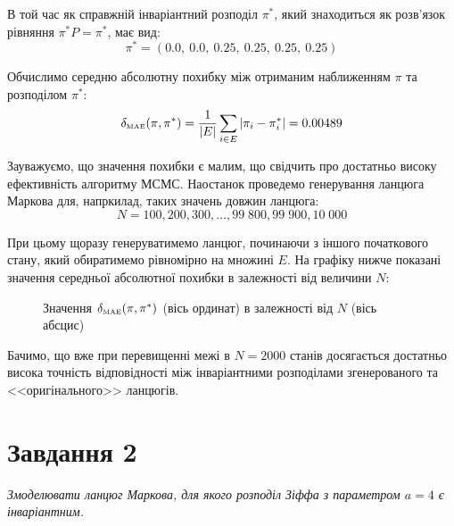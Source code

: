\documentclass[a4paper,14pt]{extarticle} %
\numberwithin{equation}{section}
\begin{document}
В той час як справжній інваріантний розподіл $\pi^*$, який знаходиться як розв'язок рівняння $\pi^*P=\pi^*$, має вид:
\[ \pi^*=(0.0,\ 0.0,\ 0.25,\ 0.25,\ 0.25,\ 0.25) \] 

Обчислимо середню абсолютну похибку між отриманим наближенням $\pi$ та розподілом $\pi^*:$ 
\[ \delta_{\text{\tiny MAE}}(\pi,\pi^*)=\frac{1}{|E|}\sum\limits_{i\in E}|\pi_{i}-\pi^*_{i}|= 0.00489 \]

Зауважуємо, що значення похибки є малим, що свідчить про достатньо високу ефективність алгоритму МСМС. Наостанок проведемо генерування ланцюга Маркова для, напркилад, таких значень довжин ланцюга:
\[ N=100,200,300,\ldots,99\;800,99\;900,10\;000 \]

При цьому щоразу генеруватимемо ланцюг, починаючи з іншого початкового стану, який обиратимемо рівномірно на множині $E$. На графіку нижче показані значення середньої абсолютної похибки в залежності від величини $N:$

\begin{figure}[H]
    \caption{Значення $\delta_{\text{\tiny MAE}}(\pi,\pi^*)$ (вісь ординат) в залежності від $N$ (вісь абсцис)}
    \label{figure: task 1}
\end{figure}

Бачимо, що вже при перевищенні межі в $N=2000$ станів досягається достатньо висока точність відповідності між інваріантними розподілами згенерованого та <<оригінального>> ланцюгів. 

\newpage
\section*{Завдання 2}

\textit{Змоделювати ланцюг Маркова, для якого розподіл Зіффа з параметром $a=4$ є інваріантним.} \\
\end{document}
